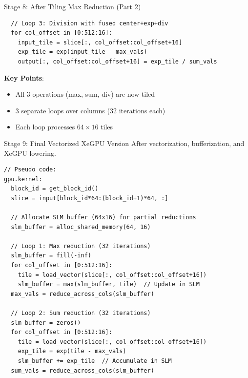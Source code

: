 \documentclass[aspectratio=169]{beamer}
\begin{document}
\begin{frame}[fragile]{Stage 8: After Tiling Max Reduction (Part 2)}
\begin{lstlisting}
  // Loop 3: Division with fused center+exp+div
  for col_offset in [0:512:16]:
    input_tile = slice[:, col_offset:col_offset+16]
    exp_tile = exp(input_tile - max_vals)
    output[:, col_offset:col_offset+16] = exp_tile / sum_vals
\end{lstlisting}

\vspace{0.3cm}

\textbf{Key Points}:
\begin{itemize}
\item All 3 operations (max, sum, div) are now tiled
\item 3 separate loops over columns (32 iterations each)
\item Each loop processes $64 \times 16$ tiles
\end{itemize}
\end{frame}

\begin{frame}[fragile]{Stage 9: Final Vectorized XeGPU Version}
After vectorization, bufferization, and XeGPU lowering.

\begin{lstlisting}
// Pseudo code:
gpu.kernel:
  block_id = get_block_id()
  slice = input[block_id*64:(block_id+1)*64, :]

  // Allocate SLM buffer (64x16) for partial reductions
  slm_buffer = alloc_shared_memory(64, 16)

  // Loop 1: Max reduction (32 iterations)
  slm_buffer = fill(-inf)
  for col_offset in [0:512:16]:
    tile = load_vector(slice[:, col_offset:col_offset+16])
    slm_buffer = max(slm_buffer, tile)  // Update in SLM
  max_vals = reduce_across_cols(slm_buffer)

  // Loop 2: Sum reduction (32 iterations)
  slm_buffer = zeros()
  for col_offset in [0:512:16]:
    tile = load_vector(slice[:, col_offset:col_offset+16])
    exp_tile = exp(tile - max_vals)
    slm_buffer += exp_tile  // Accumulate in SLM
  sum_vals = reduce_across_cols(slm_buffer)
\end{lstlisting}
\end{frame}
\end{document}
